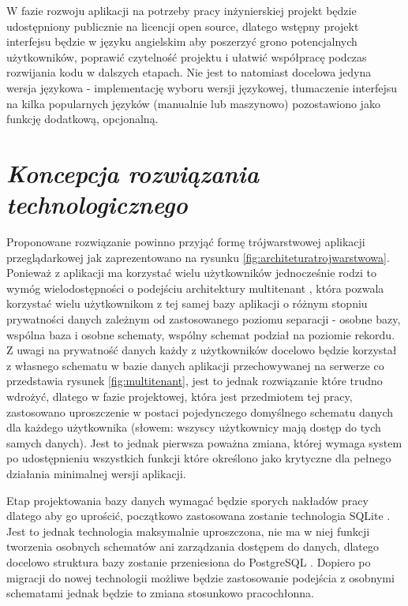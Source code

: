 \documentclass[a4paper, 10pt, twoside, openright]{report}
\newcommand{\customstylesection}[1]{\textbf{\textit{#1}}}
\begin{document}
\begin{large}
{W fazie rozwoju aplikacji na potrzeby pracy inżynierskiej projekt będzie 
udostępniony publicznie na licencji open source, dlatego wstępny projekt 
interfejsu będzie w języku angielskim aby poszerzyć grono potencjalnych 
użytkowników, poprawić czytelność projektu i ułatwić współpracę podczas 
rozwijania kodu w dalszych etapach. Nie jest to natomiast docelowa jedyna wersja
 językowa - implementację wyboru wersji językowej, tłumaczenie interfejsu na 
kilka popularnych języków (manualnie lub maszynowo) pozostawiono jako funkcję 
dodatkową, opcjonalną.}


\section{\customstylesection{Koncepcja rozwiązania technologicznego}}
{Proponowane rozwiązanie powinno przyjąć formę trójwarstwowej aplikacji 
przeglądarkowej jak zaprezentowano na rysunku \ref{fig:architeturatrojwarstwowa}.
 Ponieważ z aplikacji ma korzystać wielu użytkowników jednocześnie rodzi to 
wymóg wielodostępności o podejściu architektury multitenant \cite{multitenant}, 
która pozwala korzystać wielu użytkownikom z tej samej bazy aplikacji o różnym 
stopniu prywatności danych zależnym od zastosowanego poziomu separacji - osobne 
bazy, wspólna baza i osobne schematy, wspólny schemat podział na poziomie 
rekordu. Z uwagi na prywatność danych każdy z użytkowników docelowo będzie 
korzystał z własnego schematu w bazie danych aplikacji przechowywanej na 
serwerze co przedstawia rysunek \ref{fig:multitenant}, jest to jednak 
rozwiązanie które trudno wdrożyć, dlatego w fazie projektowej, która jest 
przedmiotem tej pracy, zastosowano uproszczenie w postaci pojedynczego 
domyślnego schematu danych dla każdego użytkownika (słowem: wszyscy użytkownicy 
mają dostęp do tych samych danych). Jest to jednak pierwsza poważna zmiana, 
której wymaga system po udostępnieniu wszystkich funkcji które określono jako 
krytyczne dla pełnego działania minimalnej wersji aplikacji.}

 {Etap projektowania bazy danych wymagać będzie sporych nakładów pracy dlatego 
 aby go uprościć, początkowo zastosowana zostanie technologia SQLite 
 \cite{SQLite}. Jest to jednak technologia maksymalnie uproszczona, nie ma w 
 niej funkcji tworzenia osobnych schematów ani zarządzania dostępem do danych, 
 dlatego docelowo struktura bazy zostanie przeniesiona do PostgreSQL 
 \cite{PostgreSQL}. Dopiero po migracji do nowej technologii możliwe będzie 
 zastosowanie podejścia z osobnymi schematami jednak będzie to zmiana stosunkowo
 pracochłonna.}


\end{large}
\end{document}
